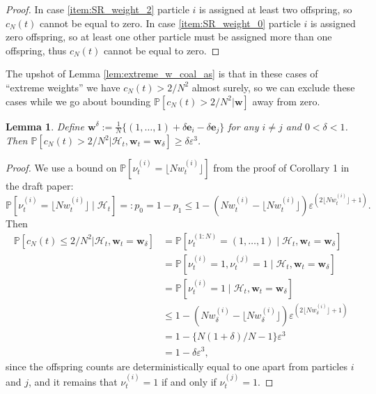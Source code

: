 \documentclass{article}
\newtheorem{lemma}{Lemma}
\newcommand{\PR}{\mathbb{P}}
\newcommand{\1}[1]{\mathbb{I}_{#1}}
\begin{document}
\begin{proof}
In case \ref{item:SR_weight_2} particle $i$ is assigned at least two offspring, so $c_N(t)$ cannot be equal to zero.
In case \ref{item:SR_weight_0} particle $i$ is assigned zero offspring, so at least one other particle must be assigned more than one offspring, thus $c_N(t)$ cannot be equal to zero.
\end{proof}

The upshot of Lemma \ref{lem:extreme_w_coal_as} is that in these cases of ``extreme weights'' we have $c_N(t) > 2/N^2$ almost surely, so we can exclude these cases while we go about bounding $\PR[c_N(t) > 2/N^2 | \mathbf{w}]$ away from zero.


\begin{lemma}\label{lem:weps_cN_prob}
Define $\mathbf{w}^\delta := \frac{1}{N}\{(1,\dots,1) + \delta \mathbf{e}_i - \delta \mathbf{e}_j \}$ for any $i \neq j$ and $0< \delta < 1$. Then $\PR[c_N(t) > 2/N^2 | \mathcal{H}_t, \mathbf{w}_t = \mathbf{w}_\delta] \geq \delta \varepsilon^3$.
\end{lemma}

\begin{proof}
We use a bound on $\PR[ \nu_t^{(i)} = \lfloor N w_t^{(i)} \rfloor ]$ from the proof of Corollary 1 in the draft paper:
\begin{equation*}
\PR[ \nu_t^{(i)} = \lfloor N w_t^{(i)} \rfloor \mid \mathcal{H}_t] =: p_0 = 1-p_1 \leq 1 - (Nw_t^{(i)} - \lfloor N w_t^{(i)} \rfloor ) \varepsilon^{(2\lfloor N w_t^{(i)} \rfloor +1)} .
\end{equation*}
Then
\begin{align*}
\PR[c_N(t) \leq 2/N^2 | \mathcal{H}_t, \mathbf{w}_t = \mathbf{w}_\delta]
&= \PR[\nu_t^{(1:N)} = (1,\dots, 1) \mid \mathcal{H}_t, \mathbf{w}_t = \mathbf{w}_\delta] \\
&= \PR[\nu_t^{(i)} = 1, \nu_t^{(j)} = 1 \mid \mathcal{H}_t, \mathbf{w}_t = \mathbf{w}_\delta] \\
&= \PR[\nu_t^{(i)} = 1 \mid \mathcal{H}_t, \mathbf{w}_t = \mathbf{w}_\delta] \\
&\leq 1- (N w_\delta^{(i)} - \lfloor N w_\delta^{(i)} \rfloor) \varepsilon^{(2\lfloor N w_\delta^{(i)} \rfloor +1)} \\
&= 1- \{N(1+ \delta)/N - 1\}\varepsilon^3 \\
&= 1 - \delta\varepsilon^3 ,
\end{align*}
since the offspring counts are deterministically equal to one apart from particles $i$ and $j$, and it remains that $\nu_t^{(i)} = 1$ if and only if $\nu_t^{(j)} = 1$.
\end{proof}
\end{document}
